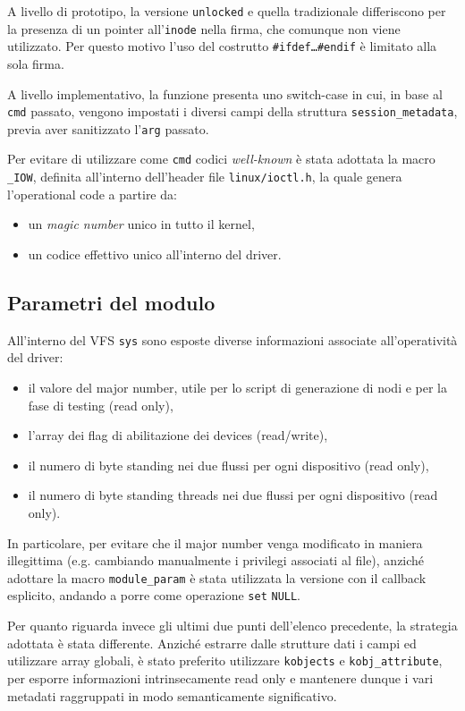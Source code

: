 \documentclass{article}
\begin{document}
A livello di prototipo, la versione \texttt{unlocked} e quella tradizionale differiscono per la presenza di un pointer all'\texttt{inode} nella firma, che comunque non viene utilizzato. Per questo motivo l'uso del costrutto \texttt{\#ifdef\dots\#endif} è limitato alla sola firma.

A livello implementativo, la funzione presenta uno switch-case in cui, in base al \texttt{cmd} passato, vengono impostati i diversi campi della struttura \texttt{session\_metadata}, previa aver sanitizzato l'\texttt{arg} passato.

Per evitare di utilizzare come \texttt{cmd} codici \textit{well-known} è stata adottata la macro \texttt{\_IOW}, definita all'interno dell'header file \texttt{linux/ioctl.h}, la quale genera l'operational code a partire da:
\begin{itemize}
        \item un \textit{magic number} unico in tutto il kernel,
        \item un codice effettivo unico all'interno del driver.
\end{itemize}

\subsection{Parametri del modulo}
All'interno del VFS \texttt{sys} sono esposte diverse informazioni associate all'operatività del driver:
\begin{itemize}
        \item il valore del major number, utile per lo script di generazione di nodi e per la fase di testing (read only),
        \item l'array dei flag di abilitazione dei devices (read/write),
        \item il numero di byte standing nei due flussi per ogni dispositivo (read only),
        \item il numero di byte standing threads nei due flussi per ogni dispositivo (read only).
\end{itemize}

In particolare, per evitare che il major number venga modificato in maniera illegittima (e.g. cambiando manualmente i privilegi associati al file), anziché adottare la macro \texttt{module\_param} è stata utilizzata la versione con il callback esplicito, andando a porre come operazione \texttt{set} \texttt{NULL}.

Per quanto riguarda invece gli ultimi due punti dell'elenco precedente, la strategia adottata è stata differente. Anziché estrarre dalle strutture dati i campi ed utilizzare array globali, è stato preferito utilizzare \texttt{kobjects} e \texttt{kobj\_attribute}, per esporre informazioni intrinsecamente read only e mantenere dunque i vari metadati raggruppati in modo semanticamente significativo.
\end{document}
